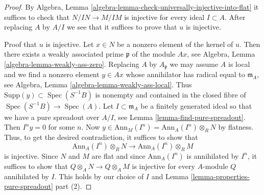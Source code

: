 \documentclass[10pt,a4paper]{amsart}
\theoremstyle{plain}
\theoremstyle{definition}
\theoremstyle{remark}
\numberwithin{equation}{subsection}
\def\Spec{\mathop{\mathrm{Spec}}}
\begin{document}
\begin{proof}
By Algebra, Lemma \ref{algebra-lemma-check-universally-injective-into-flat}
it suffices to check that $N/IN \to M/IM$ is injective for every
ideal $I \subset A$. After replacing $A$ by $A/I$ we see that it suffices
to prove that $u$ is injective.

\medskip\noindent
Proof that $u$ is injective. Let $x \in N$ be a nonzero element of the
kernel of $u$. Then there exists a weakly associated prime $\mathfrak p$
of the module $Ax$, see Algebra, Lemma \ref{algebra-lemma-weakly-ass-zero}.
Replacing $A$ by $A_\mathfrak p$ we may assume $A$ is local and
we find a nonzero element $y \in Ax$ whose annihilator has radical
equal to $\mathfrak m_A$, see
Algebra, Lemma \ref{algebra-lemma-weakly-ass-local}.
Thus $\text{Supp}(y) \subset \Spec(S^{-1}B)$ is nonempty and
contained in the closed fibre of $\Spec(S^{-1}B) \to \Spec(A)$.
Let $I \subset \mathfrak m_A$ be a
finitely generated ideal so that we have a pure spreadout over $A/I$, see
Lemma \ref{lemma-find-pure-spreadout}. Then $I^n y = 0$ for some $n$. Now
$y \in \text{Ann}_M(I^n) = \text{Ann}_A(I^n) \otimes_R N$ by flatness.
Thus, to get the desired contradiction, it suffices to show that
$$
\text{Ann}_A(I^n) \otimes_R N
\longrightarrow
\text{Ann}_A(I^n) \otimes_R M
$$
is injective. Since $N$ and $M$ are flat and since $\text{Ann}_A(I^n)$
is annihilated by $I^n$, it suffices to show that
$Q \otimes_A N \to Q \otimes_A M$ is injective for every $A$-module
$Q$ annihilated by $I$. This holds by our choice of $I$ and
Lemma \ref{lemma-properties-pure-spreadout} part (2).
\end{proof}
\end{document}
